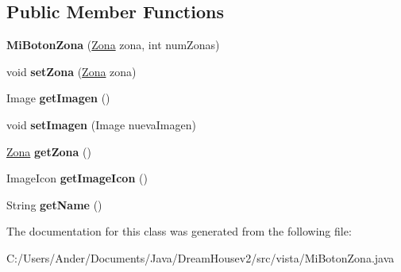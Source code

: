 \subsection*{Public Member Functions}
\begin{DoxyCompactItemize}
\item 
\mbox{\label{classvista_1_1_mi_boton_zona_a5c7db8e9a25ef3810dfc8fba178d1c78}} 
{\bfseries Mi\+Boton\+Zona} (\mbox{\hyperlink{classmodelo_1_1_zona}{Zona}} zona, int num\+Zonas)
\item 
\mbox{\label{classvista_1_1_mi_boton_zona_ac5964febf18a57ff4b3e563cc30ac2fa}} 
void {\bfseries set\+Zona} (\mbox{\hyperlink{classmodelo_1_1_zona}{Zona}} zona)
\item 
\mbox{\label{classvista_1_1_mi_boton_zona_a24c233777bcd781e7d560bea342c4824}} 
Image {\bfseries get\+Imagen} ()
\item 
\mbox{\label{classvista_1_1_mi_boton_zona_a1ee248301e0b3a6c07ba4e0b6e43f8a7}} 
void {\bfseries set\+Imagen} (Image nueva\+Imagen)
\item 
\mbox{\label{classvista_1_1_mi_boton_zona_a7e603b1af30532a70204b3aa85ec72ea}} 
\mbox{\hyperlink{classmodelo_1_1_zona}{Zona}} {\bfseries get\+Zona} ()
\item 
\mbox{\label{classvista_1_1_mi_boton_zona_a9fca131b63c836c783e27e0c3f649b97}} 
Image\+Icon {\bfseries get\+Image\+Icon} ()
\item 
\mbox{\label{classvista_1_1_mi_boton_zona_a642b9f1a6875fbb25a818c29329ac1c3}} 
String {\bfseries get\+Name} ()
\end{DoxyCompactItemize}


The documentation for this class was generated from the following file\+:\begin{DoxyCompactItemize}
\item 
C\+:/\+Users/\+Ander/\+Documents/\+Java/\+Dream\+Housev2/src/vista/Mi\+Boton\+Zona.\+java\end{DoxyCompactItemize}
